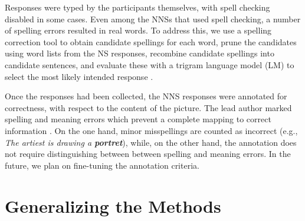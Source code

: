 \documentclass[11pt,letterpaper]{article}
\newcommand{\md}[1]{\marginpar{\scriptsize MD: #1}}
\newcommand{\lk}[1]{\marginpar{\scriptsize LK: #1}}
\renewcommand{\marginpar}[1]{}
\begin{document}
Responses were typed by the participants themselves, with spell checking disabled in some cases.  Even among the NNSs that used spell checking, a number of spelling errors resulted in real words. To address this, we use a spelling correction tool to obtain candidate spellings for each word, prune the candidates using word lists from the NS responses, recombine candidate spellings into candidate sentences, and evaluate these with a trigram language model (LM) to select the most likely intended response \citep{king:dickinson:14}.
%

\md{First crack at an annotation paragraph}
\lk{Honestly, I think it's perfect. We admit there's no inter-annotator info, but we don't go out of the way to draw attention to that...}

Once the responses had been collected, the NNS responses were
annotated for correctness, with respect to the content of the picture.
The lead author marked spelling and meaning errors which prevent a
complete mapping to correct information
\citep[see][]{king:dickinson:13}.  On the one hand, minor misspellings
are counted as incorrect (e.g., \textit{The artiest is drawing a
  \textbf{portret}}), while, on the other hand, the annotation does
not require distinguishing between between spelling and meaning
errors.  In the future, we plan on fine-tuning the annotation
criteria.

\section{Generalizing the Methods}
\label{sec:ranking}
\end{document}
